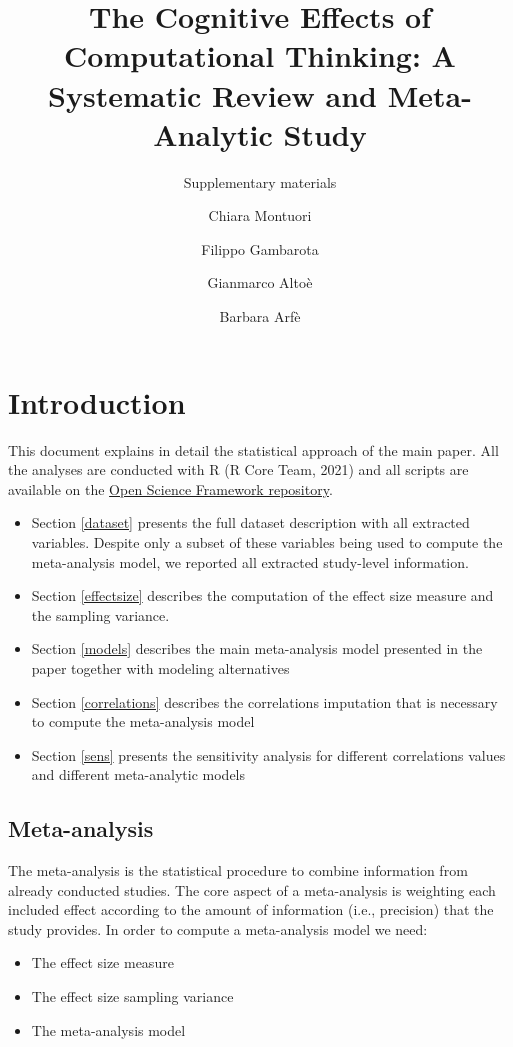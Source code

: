 \documentclass[
]{article}
\author[1]{Chiara Montuori}
\author[1]{Filippo Gambarota}
\author[1]{Gianmarco Altoè}
\author[1,2]{Barbara Arfè}
\affil[1]{\footnotesize Department of Developmental and Social Psychology, University of Padova, Italy}
\affil[2]{\footnotesize Human-Inspired Technology Research Centre, University of Padova, Italy}
\title{The Cognitive Effects of Computational Thinking: A Systematic Review and Meta-Analytic Study}
\subtitle{Supplementary materials}
\date{\vspace{-2.5em}}
\providecommand{\tightlist}{%
  \setlength{\itemsep}{0pt}\setlength{\parskip}{0pt}}
\begin{document}
\maketitle

{
\setcounter{tocdepth}{2}
\tableofcontents
}
\pagebreak

\hypertarget{introduction}{%
\section{Introduction}\label{introduction}}

This document explains in detail the statistical approach of the main paper. All the analyses are conducted with R (R Core Team, 2021) and all scripts are available on the \href{https://osf.io/uvbcd/}{Open Science Framework repository}.

\begin{itemize}
\tightlist
\item
  Section \ref{dataset} presents the full dataset description with all extracted variables. Despite only a subset of these variables being used to compute the meta-analysis model, we reported all extracted study-level information.
\item
  Section \ref{effectsize} describes the computation of the effect size measure and the sampling variance.
\item
  Section \ref{models} describes the main meta-analysis model presented in the paper together with modeling alternatives
\item
  Section \ref{correlations} describes the correlations imputation that is necessary to compute the meta-analysis model
\item
  Section \ref{sens} presents the sensitivity analysis for different correlations values and different meta-analytic models
\end{itemize}

\hypertarget{meta-analysis}{%
\subsection{Meta-analysis}\label{meta-analysis}}

The meta-analysis is the statistical procedure to combine information from already conducted studies. The core aspect of a meta-analysis is weighting each included effect according to the amount of information (i.e., precision) that the study provides. In order to compute a meta-analysis model we need:

\begin{itemize}
\tightlist
\item
  The effect size measure
\item
  The effect size sampling variance
\item
  The meta-analysis model
\end{itemize}
\end{document}
